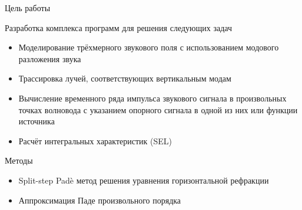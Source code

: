 \documentclass{fefu_presentation}
\begin{document}
     \begin{frame}[fragile]{Цель работы}
     	\begin{block}{}
             Разработка комплекса программ для решения следующих задач
             \begin{itemize}
                 \item Моделирование трёхмерного звукового поля с использованием модового разложения звука
                 \item Трассировка лучей, соответствующих вертикальным модам
                 \item Вычисление временного ряда импульса звукового сигнала в произвольных точках волновода с указанием опорного сигнала в одной из них или функции источника
                 \item Расчёт интегральных характеристик (SEL)
             \end{itemize}
     	\end{block}
         \begin{block}{Методы}
             \begin{itemize}
                 \item Split-step Pad\`e метод решения уравнения горизонтальной рефракции
                 \item Аппроксимация Паде произвольного порядка
             \end{itemize}
         \end{block}
     \end{frame}

    
\end{document}
